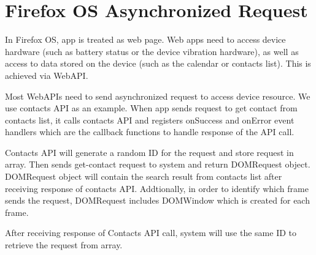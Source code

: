 \documentclass[12pt]{article}
\begin{document}
\section*{Firefox OS Asynchronized Request}
In Firefox OS, app is treated as web page. Web apps need to access device hardware (such as battery status or the device vibration hardware), as well as access to data stored on the device (such as the calendar or contacts list). This is achieved via WebAPI. %

Most WebAPIs need to send asynchronized request to access device resource. We use contacts API as an example. When app sends request to get contact from contacts list,  it calls contacts API and registers onSuccess and onError event handlers which are the callback functions to handle response of the API call. %

Contacts API will generate a random ID for the request and store request in array. Then sends get-contact request to system and return DOMRequest object. DOMRequest object will contain the search result from contacts list after receiving response of contacts API. Addtionally, in order to identify which frame sends the request, DOMRequest includes DOMWindow which is created for each frame. %

After receiving response of Contacts API call, system will use the same ID to retrieve the request from array. %
\end{document}
